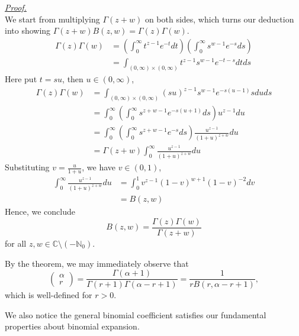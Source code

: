 \documentclass[12pt]{article}
\renewenvironment{proof}[1][Proof]{\begin{snugshade*} \underline{\textit{{#1}.}}\\}{\hfill \qedsymbol \end{snugshade*}}
\begin{document}
    \begin{proof}
        We start from multiplying $\Gamma(z+w)$ on both sides, which turns our deduction into showing $\Gamma(z+w)B(z,w)=\Gamma(z)\Gamma(w)$.\begin{align*}
            \Gamma(z)\Gamma(w)&=(\int_{0}^{\infty}t^{z-1}e^{-t}dt)(\int_{0}^{\infty}s^{w-1}e^{-s}ds)\\
            &=\int_{(0,\infty)\times(0,\infty)}t^{z-1}s^{w-1}e^{-t-s}dtds
        \end{align*}
        Here put $t=su$, then $u\in(0,\infty)$,\begin{align*}
            \Gamma(z)\Gamma(w)&=\int_{(0,\infty)\times(0,\infty)}(su)^{z-1}s^{w-1}e^{-s(u-1)}sdu ds\\
            &=\int_{0}^{\infty}(\int_{0}^{\infty}s^{z+w-1}e^{-s(u+1)}ds)u^{z-1}du\\
            &=\int_{0}^{\infty}(\int_{0}^{\infty}s^{z+w-1}e^{-s}ds)\frac{u^{z-1}}{(1+u)^{z+w}}du\\
            &=\Gamma(z+w)\int_{0}^{\infty}\frac{u^{z-1}}{(1+u)^{z+w}}du
        \end{align*}
        Substituting $v=\frac{u}{1+u}$, we have $v\in(0,1)$, \begin{align*}
            \int_{0}^{\infty}\frac{u^{z-1}}{(1+u)^{z+w}}du&=\int_{0}^{1}v^{z-1}(1-v)^{w+1}(1-v)^{-2}dv\\
            &=B(z,w)
        \end{align*}
        Hence, we conclude \[B(z,w)=\frac{\Gamma(z)\Gamma(w)}{\Gamma(z+w)}\] for all $z,w\in\mathbb{C}\setminus(-\mathbb{N}_0)$.
    \end{proof}

    By the theorem, we may immediately observe that \[\begin{pmatrix}
        \alpha\\r
    \end{pmatrix}=\frac{\Gamma(\alpha+1)}{\Gamma(r+1)\Gamma(\alpha-r+1)}=\frac{1}{r B(r,\alpha-r+1)},\] which is well-defined for $r>0$.

    We also notice the general binomial coefficient satisfies our fundamental properties about binomial expansion.
\end{document}
